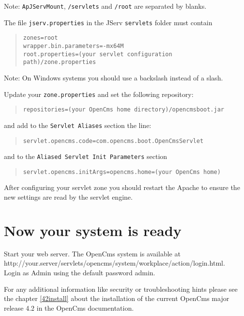 Note: \texttt{ApJServMount}, \texttt{/servlets} and \texttt{/root} are separated by blanks.

The file \texttt{jserv.properties} in the JServ \texttt{servlets} folder must contain

\begin{quote}
\texttt{zones=root\\
wrapper.bin.parameters=-mx64M\\
root.properties=(your servlet configuration path)/zone.properties}
\end{quote}

Note: On Windows systems you should use a backslash instead of a slash. 

Update your \texttt{zone.properties} and set the following repository: 

\begin{quote}
\begin{verbatim}
repositories=(your OpenCms home directory)/opencmsboot.jar
\end{verbatim}
\end{quote}

and add to the \texttt{Servlet Aliases} section the line: 

\begin{quote}
\texttt{servlet.opencms.code=com.opencms.boot.OpenCmsServlet} 
\end{quote}

and to the \texttt{Aliased Servlet Init Parameters} section 

\begin{quote}
\texttt{servlet.opencms.initArgs=opencms.home=(your OpenCms home) }
\end{quote}

After configuring your servlet zone you should restart the Apache to
ensure the new settings are read by the servlet engine.

\section{Now your system is ready}

Start your web server. The OpenCms system is available at\\
http://your.server/servlets/opencms/system/workplace/action/login.html.\\
Login as Admin using the default password admin. 

For any additional information like security or troubleshooting hints
please see the chapter \ref{42install} about the installation of the current OpenCms
major release 4.2 in the OpenCms documentation.
